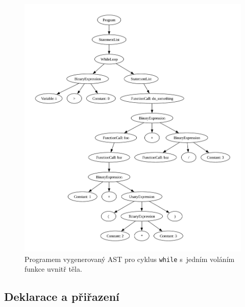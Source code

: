 \begin{figure}[h!]
	\centering
	\includegraphics[width=\textwidth]{obrazky-figures/ast_while_loop.pdf}
	\caption{Programem vygenerovaný AST pro cyklus \texttt{while} s~jedním voláním funkce uvnitř těla.}
	\label{fig_ast_while_loop}
\end{figure}

\newpage

\subsection*{Deklarace a přiřazení}

